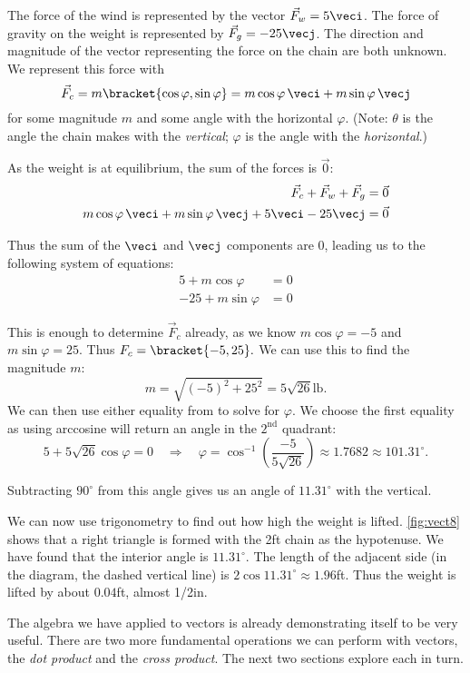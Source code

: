 {The force of the wind is represented by the vector $\vec F_w = 5\veci$. The force of gravity on the weight is represented by $\vec F_g = -25\vecj$. The direction and magnitude of the vector representing the force on the chain are both unknown. We represent this force with $$\vec F_c = m\bracket{\cos\varphi,\sin\varphi}= m\cos\varphi\, \veci + m\sin\varphi\,\vecj$$ for some magnitude $m$ and some angle with the horizontal $\varphi$. (Note: $\theta$ is the angle the chain makes with the \emph{vertical}; $\varphi$ is the angle with the \emph{horizontal}.)

As the weight is at equilibrium, the sum of the forces is $\vec0$:
\begin{align*}
\vec F_c + \vec F_w + \vec F_g &= \vec 0\\
m\cos\varphi\, \veci + m\sin\varphi\,\vecj + 5\veci - 25\vecj &=\vec 0
\end{align*}

Thus the sum of the $\veci$ and $\vecj$ components are 0, leading us to the following system of equations:
\begin{align}
5+m\cos\varphi &= 0\\
-25+m\sin\varphi &= 0
\label{eq:vect8}
\end{align}

This is enough to determine $\vec F_c$ already, as we know $m\cos \varphi = -5$ and $m\sin\varphi =25$. Thus $F_c =\bracket{-5,25}.$ We can use this to find the magnitude $m$:
\[m = \sqrt{(-5)^2+25^2} = 5\sqrt{26}%
\text{lb}.\]
We can then use either equality from  to solve for $\varphi$. We choose the first equality as using arccosine will return an angle in the $2^\text{nd}$ quadrant:
$$5 + 5\sqrt{26}\cos \varphi = 0 \quad \Rightarrow \quad \varphi = \cos^{-1}\left(\frac{-5}{5\sqrt{26}}\right) \approx 1.7682\approx 101.31^\circ.$$

Subtracting $90^\circ$ from this angle gives us an angle of $11.31^\circ$ with the vertical.

We can now use trigonometry to find out how high the weight is lifted. \autoref{fig:vect8} shows that a right triangle is formed with the 2ft chain as the hypotenuse.  We have found that the interior angle is $11.31^\circ$. The length of the adjacent side (in the diagram, the dashed vertical line) is $2\cos 11.31^\circ \approx 1.96$ft. Thus the weight is lifted by about $0.04$ft, almost 1/2in.}

The algebra we have applied to vectors is already demonstrating itself to be very useful. There are two more fundamental operations we can perform with vectors, the \emph{dot product} and the \emph{cross product}. The next two sections explore each in turn.

